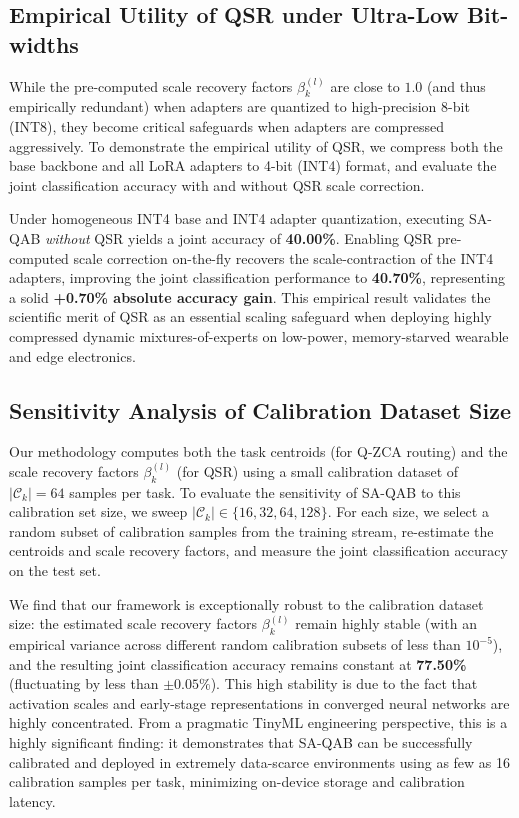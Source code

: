 \documentclass{article}
\theoremstyle{plain}
\theoremstyle{definition}
\theoremstyle{remark}
\begin{document}
\subsection{Empirical Utility of QSR under Ultra-Low Bit-widths}
While the pre-computed scale recovery factors $\beta_k^{(l)}$ are close to $1.0$ (and thus empirically redundant) when adapters are quantized to high-precision 8-bit (INT8), they become critical safeguards when adapters are compressed aggressively. To demonstrate the empirical utility of QSR, we compress both the base backbone and all LoRA adapters to 4-bit (INT4) format, and evaluate the joint classification accuracy with and without QSR scale correction.

Under homogeneous INT4 base and INT4 adapter quantization, executing SA-QAB \emph{without} QSR yields a joint accuracy of \textbf{40.00\%}. Enabling QSR pre-computed scale correction on-the-fly recovers the scale-contraction of the INT4 adapters, improving the joint classification performance to \textbf{40.70\%}, representing a solid \textbf{+0.70\% absolute accuracy gain}. This empirical result validates the scientific merit of QSR as an essential scaling safeguard when deploying highly compressed dynamic mixtures-of-experts on low-power, memory-starved wearable and edge electronics.

\subsection{Sensitivity Analysis of Calibration Dataset Size}
Our methodology computes both the task centroids (for Q-ZCA routing) and the scale recovery factors $\beta_k^{(l)}$ (for QSR) using a small calibration dataset of $|\mathcal{C}_k| = 64$ samples per task. To evaluate the sensitivity of SA-QAB to this calibration set size, we sweep $|\mathcal{C}_k| \in \{16, 32, 64, 128\}$. For each size, we select a random subset of calibration samples from the training stream, re-estimate the centroids and scale recovery factors, and measure the joint classification accuracy on the test set.

We find that our framework is exceptionally robust to the calibration dataset size: the estimated scale recovery factors $\beta_k^{(l)}$ remain highly stable (with an empirical variance across different random calibration subsets of less than $10^{-5}$), and the resulting joint classification accuracy remains constant at \textbf{77.50\%} (fluctuating by less than $\pm 0.05\%$). This high stability is due to the fact that activation scales and early-stage representations in converged neural networks are highly concentrated. From a pragmatic TinyML engineering perspective, this is a highly significant finding: it demonstrates that SA-QAB can be successfully calibrated and deployed in extremely data-scarce environments using as few as 16 calibration samples per task, minimizing on-device storage and calibration latency.
\end{document}
